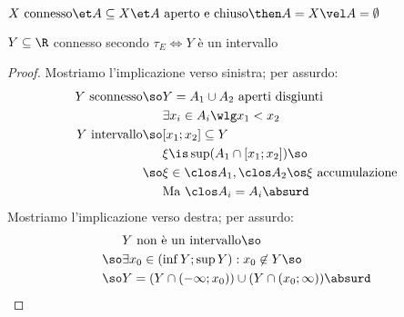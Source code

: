\begin{prop}
$X\text{ connesso}\et A\subseteq X\et A\text{ aperto e chiuso}\then A=X\vel A=\emptyset$
\end{prop}

\begin{prop}
$Y\subseteq\R$ connesso secondo $\tau_E\iff Y$ è un intervallo
\end{prop}
\begin{proof}
Mostriamo l'implicazione verso sinistra; per assurdo:
\begin{align*}
Y\text{ sconnesso}\so&Y=A_1\cup A_2\text{ aperti disgiunti}\\
&\exists x_i\in A_i\wlg x_1<x_2\\
Y\text{ intervallo}\so&[x_1;x_2]\subseteq Y\\
&\xi\is\sup(A_1\cap[x_1;x_2])\so\\
\so&\xi\in\clos A_1,\clos A_2\os\xi\text{ accumulazione}\\
&\text{Ma }\clos A_i=A_i\absurd
\end{align*}
Mostriamo l'implicazione verso destra; per assurdo:
\begin{align*}
&Y\text{ non è un intervallo}\so\\
\so&\exists x_0\in(\inf Y;\sup Y):x_0\not\in Y\so\\
\so&Y=(Y\cap(-\infty;x_0))\cup(Y\cap(x_0;\infty))\absurd \qedhere
\end{align*}
\end{proof}
